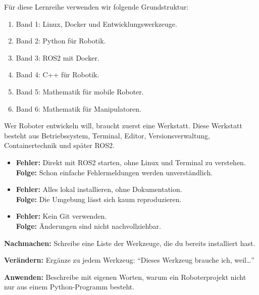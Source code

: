 \begin{loesungBox}
Für diese Lernreihe verwenden wir folgende Grundstruktur:
\begin{enumerate}
  \item Band 1: Linux, Docker und Entwicklungswerkzeuge.
  \item Band 2: Python für Robotik.
  \item Band 3: ROS2 mit Docker.
  \item Band 4: C++ für Robotik.
  \item Band 5: Mathematik für mobile Roboter.
  \item Band 6: Mathematik für Manipulatoren.
\end{enumerate}
\end{loesungBox}

\begin{merksatzBox}
Wer Roboter entwickeln will, braucht zuerst eine Werkstatt. Diese Werkstatt
besteht aus Betriebssystem, Terminal, Editor, Versionsverwaltung,
Containertechnik und später ROS2.
\end{merksatzBox}

\begin{fehlerBox}
\begin{itemize}
  \item \textbf{Fehler:} Direkt mit ROS2 starten, ohne Linux und Terminal zu verstehen.\\
        \textbf{Folge:} Schon einfache Fehlermeldungen werden unverständlich.
  \item \textbf{Fehler:} Alles lokal installieren, ohne Dokumentation.\\
        \textbf{Folge:} Die Umgebung lässt sich kaum reproduzieren.
  \item \textbf{Fehler:} Kein Git verwenden.\\
        \textbf{Folge:} Änderungen sind nicht nachvollziehbar.
\end{itemize}
\end{fehlerBox}

\begin{uebungBox}
\textbf{Nachmachen:} Schreibe eine Liste der Werkzeuge, die du bereits installiert hast.

\textbf{Verändern:} Ergänze zu jedem Werkzeug: \enquote{Dieses Werkzeug brauche ich, weil\ldots}

\textbf{Anwenden:} Beschreibe mit eigenen Worten, warum ein Roboterprojekt
nicht nur aus einem Python-Programm besteht.
\end{uebungBox}

